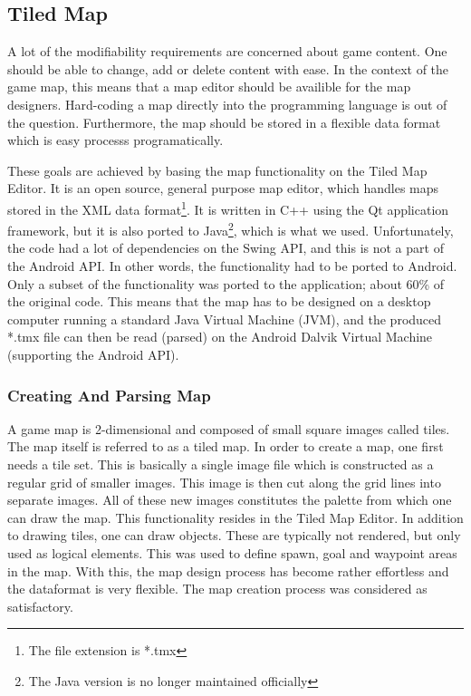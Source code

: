\subsection{Tiled Map}
A lot of the modifiability requirements are concerned about game content. One should be able to change, add or delete content with ease. In the context of the game map, this means that a map editor should be availible for the map designers. Hard-coding a map directly into the programming language is out of the question. Furthermore, the map should be stored in a flexible data format which is easy processs programatically. 

These goals are achieved by basing the map functionality on the Tiled Map Editor.\cite{mapeditor} It is an open source, general purpose map editor, which handles maps stored in the XML data format\footnote{The file extension is *.tmx}. It is written in C++ using the Qt application framework, but it is also ported to Java\footnote{The Java version is no longer maintained officially}, which is what we used. Unfortunately, the code had a lot of dependencies on the Swing API, and this is not a part of the Android API. In other words, the functionality had to be ported to Android. Only a subset of the functionality was ported to the application; about 60\% of the original code. This means that the map has to be designed on a desktop computer running a standard Java Virtual Machine (JVM), and the produced *.tmx file can then be read (parsed) on the Android Dalvik Virtual Machine (supporting the Android API).

\subsubsection{Creating And Parsing Map}\label{parsingmap}
A game map is 2-dimensional and composed of small square images called tiles. The map itself is referred to as a tiled map. In order to create a map, one first needs a tile set. This is basically a single image file which is constructed as a regular grid of smaller images. This image is then cut along the grid lines into separate images. All of these new images constitutes the palette from which one can draw the map. This functionality resides in the Tiled Map Editor. In addition to drawing tiles, one can draw objects. These are typically not rendered, but only used as logical elements. This was used to define spawn, goal and waypoint areas in the map. With this, the map design process has become rather effortless and the dataformat is very flexible. The map creation process was considered as satisfactory.

